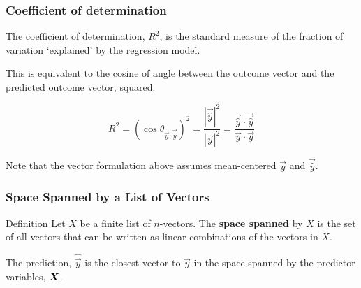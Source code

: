 \documentclass{beamer}
\begin{document}
\begin{frame}
  \frametitle{Coefficient of determination}


The coefficient of determination, $R^2$, is the standard measure of the fraction of variation `explained' by the regression model. 

This is equivalent to the cosine of angle between the outcome vector and the predicted outcome vector, squared.

\medskip
\[
R^2 = (\cos \theta_{\vec{y},\vec{\widehat{y}}})^2 
    = \frac{|\vec{\widehat{y}}|^2}{|\vec{y}|^2} 
    = \frac{\vec{\widehat{y}} \cdot \vec{\widehat{y}}}{\vec{y} \cdot \vec{y}}
\]

Note that the vector formulation above assumes mean-centered $\vec{y}$ and $\vec{\widehat{y}}$.


\end{frame}



\begin{frame}
  \frametitle{Space Spanned by a List of Vectors}


\begin{block}{Definition}
Let $X$ be a finite list of $n$-vectors. The \textbf{space spanned} by $X$ is the set of all vectors that can be written as linear combinations of the vectors in $X$.
\end{block}

\smallskip

\begin{center}
\end{center}

\smallskip

The prediction, $\hat{\vec{y}}$ is the closest vector to $\vec{y}$ in the space spanned by the predictor variables, $\bm{X}$.

\end{frame}

\end{document}
